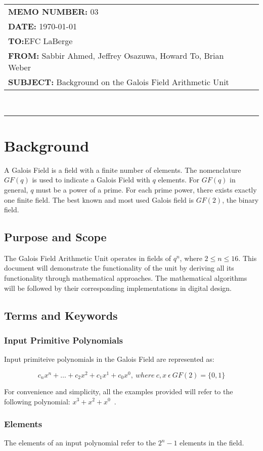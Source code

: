 \documentclass[11pt]{extarticle}
\newcommand{\Sabbir}{Sabbir Ahmed}
\newcommand{\Jeffrey}{Jeffrey Osazuwa}
\newcommand{\Howard}{Howard To}
\newcommand{\Brian}{Brian Weber}
\newcommand{\examplepoly}{$x^{3}+x^{2}+x^{0}$}
\newcommand{\documentinfo}[5]{
    \begin{centering}
        \parbox{2in}{
        \begin{spacing}{1}
            \begin{flushleft}
                \begin{tabular}{l l} #1 \\ #2 \\ #3 \\ #4 \\ #5 \\
                \end{tabular} \\
                \rule{\textwidth}{1pt}
            \end{flushleft}
        \end{spacing} }
    \end{centering} }
\begin{document}
    \documentinfo{\textbf{MEMO NUMBER:} 03}{\textbf{DATE:}
    \today}{\textbf{TO:}EFC LaBerge}{\textbf{FROM: }\Sabbir, \Jeffrey, \Howard,
    \Brian}{\textbf{SUBJECT: } Background on the Galois Field Arithmetic Unit}
    \vspace{-0.1in}

    \section{Background} A Galois Field is a field with a finite number of
    elements. The nomenclature $GF(q)$ is used to indicate a Galois Field with
    $q$ elements. For $GF(q)$ in general, $q$ must be a power of a prime. For
    each prime power, there exists exactly one finite field. The best known and
    most used Galois field is $GF(2)$, the binary field.

        \subsection{Purpose and Scope} The Galois Field Arithmetic Unit
        operates in fields of $q^n$, where $2 \leq n \leq 16$. This document
        will demonstrate the functionality of the unit by deriving all its
        functionality through mathematical approaches. The mathematical
        algorithms will be followed by their corresponding implementations in
        digital design.

        \subsection{Terms and Keywords}

            \subsubsection{Input Primitive Polynomials} Input primiteive
            polynomials in the Galois Field are represented as:

            \[ c_{n}x^{n}+\ldots+c_{2}x^{2}+c_{1}x^{1}+c_{0}x^{0}, \ where \
            c,x \ \epsilon \ GF(2)=\{0,1\} \]

            For convenience and simplicity, all the examples provided will
            refer to the following polynomial: \examplepoly~.

            \subsubsection{Elements} The elements of an input polynomial refer
            to the $2^{n}-1$ elements in the field.
\end{document}
